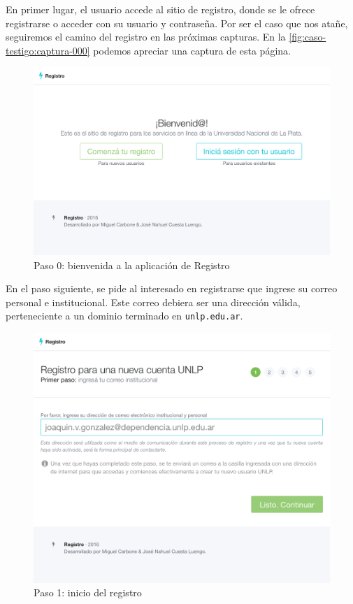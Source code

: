 En primer lugar, el usuario accede al sitio de registro, donde se le ofrece registrarse o acceder con su usuario y contraseña. Por ser el caso que nos atañe, seguiremos el camino del registro en las próximas capturas. En la \autoref{fig:caso-testigo:captura-000} podemos apreciar una captura de esta página.

\begin{figure}
  \centering
  \includegraphics[width=\textwidth,keepaspectratio]{src/images/05-capitulo-5/capturas/page_000.png}
  \caption{Paso 0: bienvenida a la aplicación de Registro}
  \label{fig:caso-testigo:captura-000}
\end{figure}

En el paso siguiente, se pide al interesado en registrarse que ingrese su correo personal e institucional. Este correo debiera ser una dirección válida, perteneciente a un dominio terminado en \texttt{unlp.edu.ar}.

\begin{figure}
  \centering
  \includegraphics[width=\textwidth,keepaspectratio]{src/images/05-capitulo-5/capturas/page_001.png}
  \caption{Paso 1: inicio del registro}
  \label{fig:caso-testigo:captura-001}
\end{figure}

